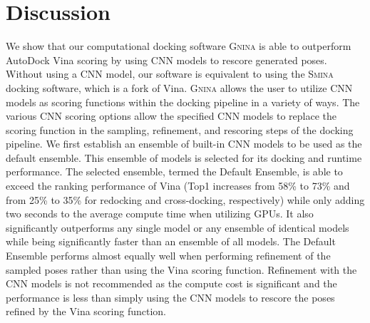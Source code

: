 \documentclass[journal=jcisd8,manuscript=article]{achemso}
\begin{document}
\section{Discussion}
We show that our computational docking software \textsc{Gnina} is able to outperform AutoDock Vina scoring by using CNN models to rescore generated poses. Without using a CNN model, our software is equivalent to using the \textsc{Smina} docking software, which is a fork of Vina. \textsc{Gnina} allows the user to utilize CNN models as scoring functions within the docking pipeline in a variety of ways. The various CNN scoring options allow the specified CNN models to replace the scoring function in the sampling, refinement, and rescoring steps of the docking pipeline. We first establish an ensemble of built-in CNN models to be used as the default ensemble. This ensemble of models is selected for its docking and runtime performance. The selected ensemble, termed the Default Ensemble, is able to exceed the ranking performance of Vina (Top1 increases from 58\% to 73\% and from 25\% to 35\% for redocking and cross-docking, respectively) while only adding two seconds to the average compute time when utilizing GPUs. It also significantly outperforms any single model or any ensemble of identical models while being significantly faster than an ensemble of all models. The Default Ensemble performs almost equally well when performing refinement of the sampled poses rather than using the Vina scoring function. Refinement with the CNN models is not recommended as the compute cost is significant and the performance is less than simply using the CNN models to rescore the poses refined by the Vina scoring function.
\end{document}
